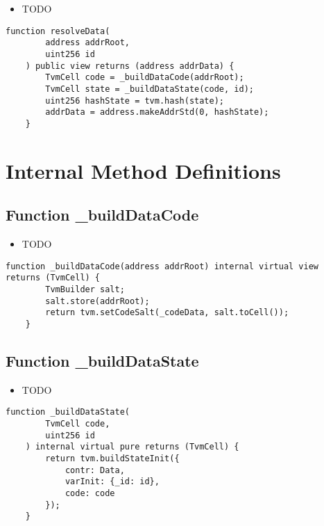 \begin{itemize}
\item TODO
\end{itemize}

\begin{lstlisting}[firstnumber=17]
    function resolveData(
        address addrRoot,
        uint256 id
    ) public view returns (address addrData) {
        TvmCell code = _buildDataCode(addrRoot);
        TvmCell state = _buildDataState(code, id);
        uint256 hashState = tvm.hash(state);
        addrData = address.makeAddrStd(0, hashState);
    }
\end{lstlisting}

\section{Internal Method Definitions}


\subsection{Function \_{}buildDataCode}

\begin{itemize}
\item TODO
\end{itemize}

\begin{lstlisting}[firstnumber=27]
    function _buildDataCode(address addrRoot) internal virtual view returns (TvmCell) {
        TvmBuilder salt;
        salt.store(addrRoot);
        return tvm.setCodeSalt(_codeData, salt.toCell());
    }
\end{lstlisting}

\subsection{Function \_{}buildDataState}

\begin{itemize}
\item TODO
\end{itemize}

\begin{lstlisting}[firstnumber=33]
    function _buildDataState(
        TvmCell code,
        uint256 id
    ) internal virtual pure returns (TvmCell) {
        return tvm.buildStateInit({
            contr: Data,
            varInit: {_id: id},
            code: code
        });
    }
\end{lstlisting}
